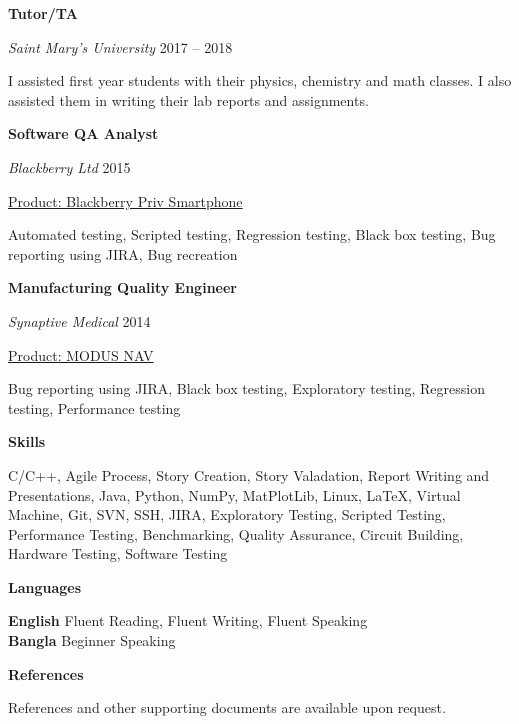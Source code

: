 \documentclass[12pt %
]{article}
\newcommand{\cvsection}[1] {
  \begin{center}
    \large\color{draculapurple}\textbf{#1}
  \end{center}
}
\begin{document}
\vspace{1em}
\textbf{\color{draculapurple}Tutor/TA}

\emph{Saint Mary's University} \hfill 2017 -- 2018

I assisted first year students with their physics, chemistry and math classes. I also assisted them in writing their lab reports and assignments.

\vspace{1em}
\textbf{\color{draculapurple}Software QA Analyst}

\emph{Blackberry Ltd} \hfill 2015

\underline{Product: Blackberry Priv Smartphone}

Automated testing,
Scripted testing,
Regression testing,
Black box testing,
Bug reporting using JIRA,
Bug recreation

\vspace{1em}
\textbf{\color{draculapurple}Manufacturing Quality Engineer}

\emph{Synaptive Medical} \hfill 2014

\underline{Product: MODUS NAV}

Bug reporting using JIRA,
Black box testing,
Exploratory testing,
Regression testing,
Performance testing


%

\cvsection{Skills}
C/C++,
Agile Process,
Story Creation,
Story Valadation,
Report Writing and Presentations,
Java,
Python,
NumPy,
MatPlotLib,
Linux,
\LaTeX,
Virtual Machine,
Git,
SVN,
SSH,
JIRA,
Exploratory Testing,
Scripted Testing,
Performance Testing,
Benchmarking,
Quality Assurance,
Circuit Building,
Hardware Testing,
Software Testing

\cvsection{Languages}
\textbf{English} Fluent Reading, Fluent Writing, Fluent Speaking\\
\textbf{Bangla} Beginner Speaking

\cvsection{References}
References and other supporting documents are available upon request.
\end{document}
